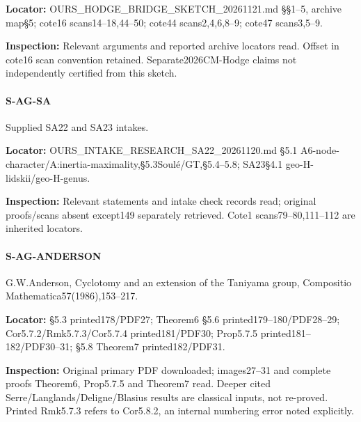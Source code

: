 \documentclass[11pt,a4paper]{article}
\begin{document}
\textbf{Locator:} OURS\_\allowbreak{}HODGE\_\allowbreak{}BRIDGE\_\allowbreak{}SKETCH\_\allowbreak{}20261121.\allowbreak{}md §§1–\allowbreak{}5, archive map§5; cote16 scans14–\allowbreak{}18,44–\allowbreak{}50; cote44 scans2,4,6,8–\allowbreak{}9; cote47 scans3,5–\allowbreak{}9.

\textbf{Inspection:} Relevant arguments and reported archive locators read.\allowbreak{} Offset in cote16 scan convention retained.\allowbreak{} Separate2026CM-Hodge claims not independently certified from this sketch.\allowbreak{}


\paragraph{S-AG-SA} Supplied SA22 and SA23 intakes.

\textbf{Locator:} OURS\_\allowbreak{}INTAKE\_\allowbreak{}RESEARCH\_\allowbreak{}SA22\_\allowbreak{}20261120.\allowbreak{}md §5.\allowbreak{}1 A6-node-character/\allowbreak{}A:\allowbreak{}inertia-maximality,§5.\allowbreak{}3Soulé/\allowbreak{}GT,§5.\allowbreak{}4–\allowbreak{}5.\allowbreak{}8; SA23§4.\allowbreak{}1 geo-H-lidskii/\allowbreak{}geo-H-genus.

\textbf{Inspection:} Relevant statements and intake check records read; original proofs/\allowbreak{}scans absent except149 separately retrieved.\allowbreak{} Cote1 scans79–\allowbreak{}80,111–\allowbreak{}112 are inherited locators.\allowbreak{}


\paragraph{S-AG-ANDERSON} G.\allowbreak{}W.\allowbreak{}Anderson, Cyclotomy and an extension of the Taniyama group, Compositio Mathematica57(1986),153–\allowbreak{}217.

\textbf{Locator:} §5.\allowbreak{}3 printed178/\allowbreak{}PDF27; Theorem6 §5.\allowbreak{}6 printed179–\allowbreak{}180/\allowbreak{}PDF28–\allowbreak{}29; Cor5.\allowbreak{}7.\allowbreak{}2/\allowbreak{}Rmk5.\allowbreak{}7.\allowbreak{}3/\allowbreak{}Cor5.\allowbreak{}7.\allowbreak{}4 printed181/\allowbreak{}PDF30; Prop5.\allowbreak{}7.\allowbreak{}5 printed181–\allowbreak{}182/\allowbreak{}PDF30–\allowbreak{}31; §5.\allowbreak{}8 Theorem7 printed182/\allowbreak{}PDF31.

\textbf{Inspection:} Original primary PDF downloaded; images27–\allowbreak{}31 and complete proofs Theorem6, Prop5.\allowbreak{}7.\allowbreak{}5 and Theorem7 read.\allowbreak{} Deeper cited Serre/\allowbreak{}Langlands/\allowbreak{}Deligne/\allowbreak{}Blasius results are classical inputs, not re-proved.\allowbreak{} Printed Rmk5.\allowbreak{}7.\allowbreak{}3 refers to Cor5.\allowbreak{}8.\allowbreak{}2, an internal numbering error noted explicitly.\allowbreak{}
\end{document}
